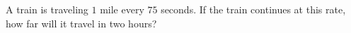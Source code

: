 A train is traveling $1$ mile every $75$ seconds. If the train continues at this rate, how far will it travel in two hours?
